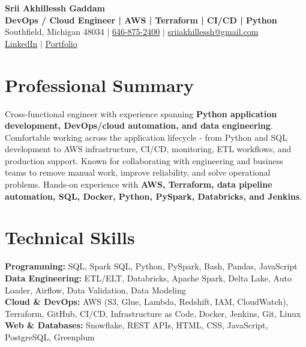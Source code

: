 \documentclass[letterpaper,10pt]{article}
\begin{document}
\fontsize{9.35pt}{10.45pt}\selectfont

\begin{center}
    {\LARGE \textbf{Srii Akhillessh Gaddam}} \\[-1pt]
    \textbf{DevOps / Cloud Engineer | AWS | Terraform | CI/CD | Python} \\[2pt]
    Southfield, Michigan 48034 $|$
    \href{tel:6468752400}{646-875-2400} $|$
    \href{mailto:sriiakhillessh@gmail.com}{sriiakhillessh@gmail.com} \\[1pt]
    \href{https://www.linkedin.com/in/srii-akhiilessh-gaddam-b48668191/}{LinkedIn} $|$
    \href{https://sriiakhillesshg.github.io/portfolio/}{Portfolio}
\end{center}
\vspace{-8pt}

\section{Professional Summary}
\small{Cross-functional engineer with experience spanning \textbf{Python application development, DevOps/cloud automation, and data engineering}. Comfortable working across the application lifecycle - from Python and SQL development to AWS infrastructure, CI/CD, monitoring, ETL workflows, and production support. Known for collaborating with engineering and business teams to remove manual work, improve reliability, and solve operational problems. Hands-on experience with \textbf{AWS, Terraform, data pipeline automation, SQL, Docker, Python, PySpark, Databricks, and Jenkins}.}

\section{Technical Skills}
\small{
\textbf{Programming:} SQL, Spark SQL, Python, PySpark, Bash, Pandas, JavaScript \\
\textbf{Data Engineering:} ETL/ELT, Databricks, Apache Spark, Delta Lake, Auto Loader, Airflow, Data Validation, Data Modeling \\
\textbf{Cloud \& DevOps:} AWS (S3, Glue, Lambda, Redshift, IAM, CloudWatch), Terraform, GitHub, CI/CD, Infrastructure as Code, Docker, Jenkins, Git, Linux \\
\textbf{Web \& Databases:} Snowflake, REST APIs, HTML, CSS, JavaScript, PostgreSQL, Greenplum
}
\end{document}
